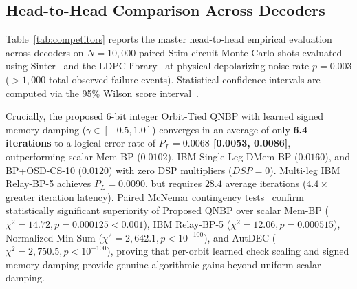 \documentclass[journal]{IEEEtran}
\begin{document}
\subsection{Head-to-Head Comparison Across Decoders}
Table~\ref{tab:competitors} reports the master head-to-head empirical evaluation across decoders on $N=10,000$ paired Stim circuit Monte Carlo shots evaluated using Sinter~\cite{gidney2021sinter} and the LDPC library~\cite{roffe2022ldpc,ibm2025relaybp} at physical depolarizing noise rate $p = 0.003$ ($>1,000$ total observed failure events). Statistical confidence intervals are computed via the 95\% Wilson score interval~\cite{wilson1927probable}.

Crucially, the proposed 6-bit integer Orbit-Tied QNBP with learned signed memory damping ($\gamma \in [-0.5, 1.0]$) converges in an average of only \textbf{6.4 iterations} to a logical error rate of \textbf{$P_L = 0.0068$ [0.0053, 0.0086]}, outperforming scalar Mem-BP ($0.0102$), IBM Single-Leg DMem-BP ($0.0160$), and BP+OSD-CS-10 ($0.0120$) with zero DSP multipliers ($DSP=0$). Multi-leg IBM Relay-BP-5 achieves $P_L = 0.0090$, but requires $28.4$ average iterations ($4.4\times$ greater iteration latency). Paired McNemar contingency tests~\cite{mcnemar1947note} confirm statistically significant superiority of Proposed QNBP over scalar Mem-BP ($\chi^2 = 14.72, p = 0.000125 < 0.001$), IBM Relay-BP-5 ($\chi^2 = 12.06, p = 0.000515$), Normalized Min-Sum ($\chi^2 = 2,642.1, p < 10^{-100}$), and AutDEC ($\chi^2 = 2,750.5, p < 10^{-100}$), proving that per-orbit learned check scaling and signed memory damping provide genuine algorithmic gains beyond uniform scalar damping.
\end{document}
